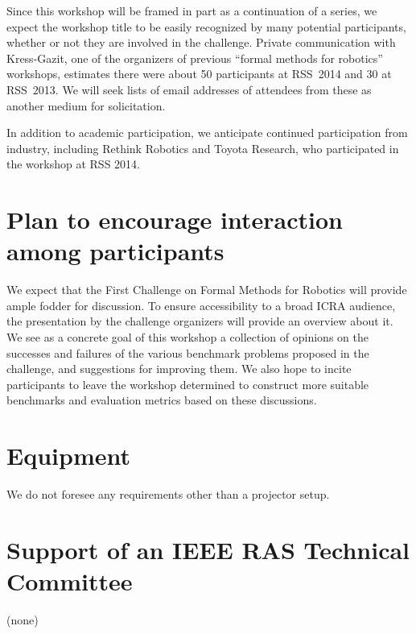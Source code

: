 \documentclass{amsart}
\begin{document}
Since this workshop will be framed in part as a continuation of a series, we
expect the workshop title to be easily recognized by many potential
participants, whether or not they are involved in the challenge.  Private
communication with Kress-Gazit, one of the organizers of previous ``formal
methods for robotics'' workshops, estimates there were about 50 participants at
RSS~2014 and 30 at RSS~2013.  We will seek lists of email addresses of attendees
from these as another medium for solicitation.

In addition to academic participation, we anticipate continued participation from industry, including Rethink Robotics and Toyota Research, who participated in the workshop at RSS 2014. 


\section{Plan to encourage interaction among participants}
We expect that the First Challenge on Formal Methods for Robotics will provide ample fodder for discussion.  To ensure accessibility to a broad ICRA audience, the presentation by the challenge organizers will provide an overview about it.  We see as a concrete goal of this workshop a collection of opinions on the successes and failures of the various benchmark problems proposed in the challenge, and suggestions for improving them. We also hope to incite participants to leave the workshop determined to construct more suitable benchmarks and evaluation metrics based on these discussions.



\section{Equipment}
We do not foresee any requirements other than a projector setup.

\section{Support of an IEEE RAS Technical Committee}

(none)
\end{document}
